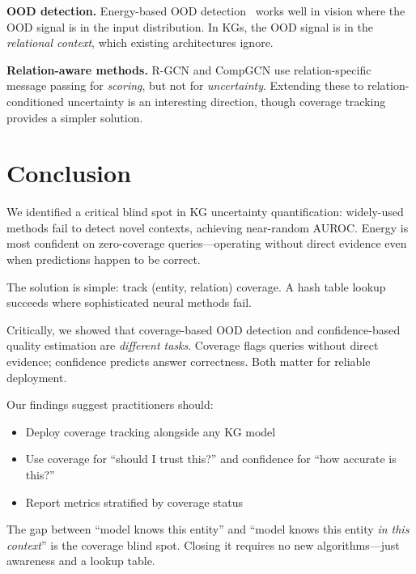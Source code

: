 \documentclass{article}
\begin{document}
\textbf{OOD detection.} Energy-based OOD detection~\citep{liu2020energy} works well in vision where the OOD signal is in the input distribution. In KGs, the OOD signal is in the \emph{relational context}, which existing architectures ignore.

\textbf{Relation-aware methods.} R-GCN and CompGCN use relation-specific message passing for \emph{scoring}, but not for \emph{uncertainty}. Extending these to relation-conditioned uncertainty is an interesting direction, though coverage tracking provides a simpler solution.

\section{Conclusion}

We identified a critical blind spot in KG uncertainty quantification: widely-used methods fail to detect novel contexts, achieving near-random AUROC. Energy is most confident on zero-coverage queries---operating without direct evidence even when predictions happen to be correct.

The solution is simple: track (entity, relation) coverage. A hash table lookup succeeds where sophisticated neural methods fail.

Critically, we showed that coverage-based OOD detection and confidence-based quality estimation are \emph{different tasks}. Coverage flags queries without direct evidence; confidence predicts answer correctness. Both matter for reliable deployment.

Our findings suggest practitioners should:
\begin{itemize}
    \item Deploy coverage tracking alongside any KG model
    \item Use coverage for ``should I trust this?'' and confidence for ``how accurate is this?''
    \item Report metrics stratified by coverage status
\end{itemize}

The gap between ``model knows this entity'' and ``model knows this entity \emph{in this context}'' is the coverage blind spot. Closing it requires no new algorithms---just awareness and a lookup table.



\end{document}
